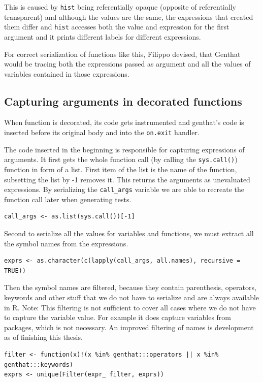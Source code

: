 \documentclass[thesis=B,english]{FITthesis}[2012/10/20]
\begin{document}
This is caused by \verb|hist| being referentially opaque (opposite of referentially transparent) and although the values are the same, the expressions that created them differ and \verb|hist| accesses both the value and expression for the first argument and it prints different labels for different expressions.

For correct serialization of functions like this, Filippo devised, that Genthat would be tracing both the expressions passed as argument and all the values of variables contained in those expressions.

\subsection{Capturing arguments in decorated functions}
When function is decorated, its code gets instrumented and genthat’s code is inserted before its original body and into the \verb|on.exit| handler.

The code inserted in the beginning is responsible for capturing expressions of arguments. It first gets the whole function call (by calling the \verb|sys.call()|) function in form of a list. First item of the list is the name of the function, subsetting the list by -1 removes it. This returns the arguments as unevaluated expressions. By serializing the \verb|call_args| variable we are able to recreate the function call later when generating tests.

\begin{verbatim}
call_args <- as.list(sys.call())[-1]
\end{verbatim}

Second to serialize all the values for variables and functions, we must extract all the symbol names from the expressions.

\begin{verbatim}
exprs <- as.character(c(lapply(call_args, all.names), recursive = TRUE))
\end{verbatim}

Then the symbol names are filtered, because they contain parenthesis, operators, keywords and other stuff that we do not have to serialize and are always available in R. 
Note: This filtering is not sufficient to cover all cases where we do not have to capture the variable value. For example it does capture variables from packages, which is not necessary. An improved filtering of names is development as of finishing this thesis.

\begin{verbatim}
filter <- function(x)!(x %in% genthat:::operators || x %in% genthat:::keywords)
exprs <- unique(Filter(expr_ filter, exprs))
\end{verbatim}
\end{document}

